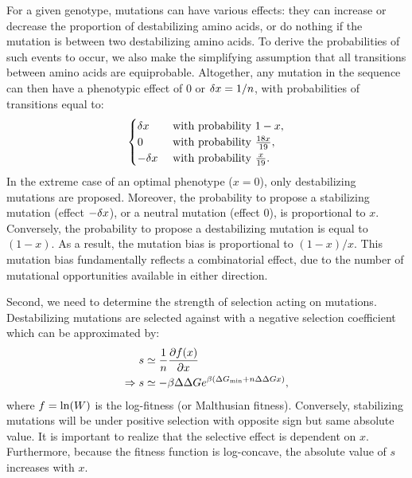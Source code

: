 For a given genotype, mutations can have various effects: they can increase or decrease the proportion of destabilizing amino acids, or do nothing if the mutation is between two destabilizing amino acids.
To derive the probabilities of such events to occur, we also make the simplifying assumption that all transitions between amino acids are equiprobable.
Altogether, any mutation in the sequence can then have a phenotypic effect of $0$ or $\delta x=1 /n$, with probabilities of transitions equal to:
\begin{gather}
    \begin{cases}
        \dx &\text{ with probability } 1-x, \\
        0 &\text{ with probability } \frac{18 x }{19}, \\
        -\dx &\text{ with probability } \frac{x}{19}.\\
    \end{cases} \label{eq:proba}
\end{gather}
In the extreme case of an optimal {phenotype} ($x = 0$), only destabilizing mutations are proposed.
Moreover, the probability to propose a stabilizing mutation (effect $-\delta x$), or a {neutral} mutation (effect $0$), is proportional to $x$.
Conversely, the probability to propose a destabilizing mutation is equal to $(1-x)$.
As a result, the mutation bias is proportional to $(1-x)/x$.
This mutation bias fundamentally reflects a combinatorial effect, due to the number of mutational opportunities available in either direction.

Second, we need to determine the strength of selection acting on mutations.
Destabilizing mutations are selected against with a negative selection coefficient which can be approximated by:
\begin{align}
    s & \simeq \frac{1}{\NbrSites}\frac{ \partial \logfit (x) }{\partial x} \label{eq:s} \\
    \Rightarrow s & \simeq - \beta \EmpiricalDeltaDeltaG e^{\beta (\EmpiricalDeltaGmin + \NbrSites \EmpiricalDeltaDeltaG x)}, \label{eq:s-unfolded}
\end{align}
where $ f = \ln (W)$ is the log-fitness (or Malthusian fitness).
Conversely, stabilizing mutations will be under positive selection with opposite sign but same absolute value.
It is important to realize that the selective effect is dependent on $x$.
Furthermore, because the fitness function is log-concave, the absolute value of $s$ increases with $x$.

